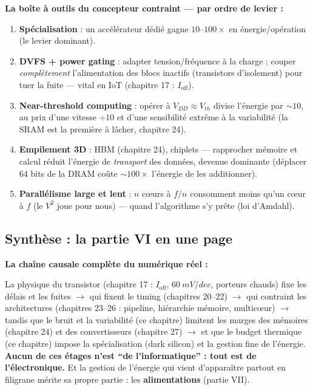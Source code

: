 \documentclass[12pt,a4paper,twoside]{book}
\begin{document}
\begin{pratique}
\textbf{La boîte à outils du concepteur contraint --- par ordre de levier :}
\begin{enumerate}[nosep]
\item \textbf{Spécialisation} : un accélérateur dédié gagne $10$--$100\times$ en énergie/opération (le levier dominant).
\item \textbf{DVFS + power gating} : adapter tension/fréquence à la charge ; couper \textit{complètement} l'alimentation des blocs inactifs (transistors d'isolement) pour tuer la fuite --- vital en IoT (chapitre 17 : $I_{\text{off}}$).
\item \textbf{Near-threshold computing} : opérer à $V_{DD} \approx V_{th}$ divise l'énergie par $\sim 10$, au prix d'une vitesse $\div 10$ et d'une sensibilité extrême à la variabilité (la SRAM est la première à lâcher, chapitre 24).
\item \textbf{Empilement 3D} : HBM (chapitre 24), chiplets --- rapprocher mémoire et calcul réduit l'énergie de \textit{transport} des données, devenue dominante (déplacer 64 bits de la DRAM coûte $\sim 100\times$ l'énergie de les additionner).
\item \textbf{Parallélisme large et lent} : $n$ cœurs à $f/n$ consomment moins qu'un cœur à $f$ (le $V^2$ joue pour nous) --- quand l'algorithme s'y prête (loi d'Amdahl).
\end{enumerate}
\end{pratique}

\subsection{Synthèse : la partie VI en une page}

\begin{intuition}
\textbf{La chaîne causale complète du numérique réel :}

La physique du transistor (chapitre 17 : $I_{\text{off}}$, $\SI{60}{mV/dec}$, porteurs chauds) fixe les délais et les fuites $\to$ qui fixent le timing (chapitres 20--22) $\to$ qui contraint les architectures (chapitres 23--26 : pipeline, hiérarchie mémoire, multicœur) $\to$ tandis que le bruit et la variabilité (ce chapitre) limitent les marges des mémoires (chapitre 24) et des convertisseurs (chapitre 27) $\to$ et que le budget thermique (ce chapitre) impose la spécialisation (dark silicon) et la gestion fine de l'énergie. \textbf{Aucun de ces étages n'est ``de l'informatique'' : tout est de l'électronique.} Et la gestion de l'énergie qui vient d'apparaître partout en filigrane mérite sa propre partie : les \textbf{alimentations} (partie VII).
\end{intuition}
\end{document}
